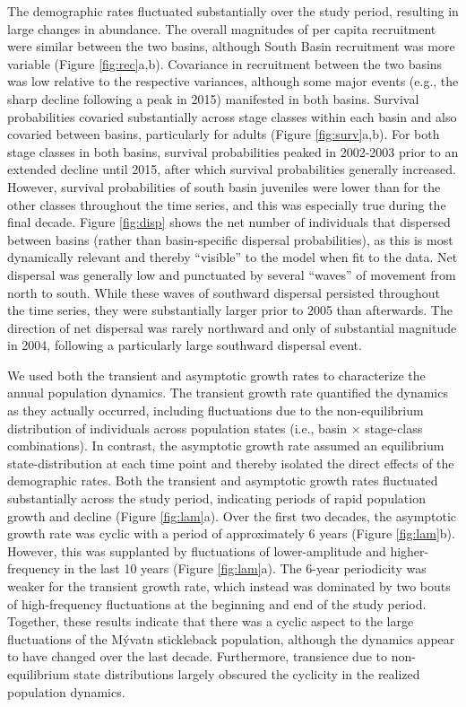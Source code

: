 \documentclass[11pt]{article}
\begin{document}
The demographic rates fluctuated substantially over the study period,
resulting in large changes in abundance.
The overall magnitudes of per capita recruitment were similar between the two basins,
although South Basin recruitment was more variable (Figure \ref{fig:rec}a,b).
Covariance in recruitment between the two basins was low relative
to the respective variances,
although some major events (e.g., the sharp decline following a peak in 2015)
manifested in both basins.
Survival probabilities covaried substantially across stage classes within each basin
and also covaried between basins, particularly for adults (Figure \ref{fig:surv}a,b).
For both stage classes in both basins,
survival probabilities peaked in 2002-2003
prior to an extended decline until 2015,
after which survival probabilities generally increased.
However, survival probabilities of south basin juveniles were lower
than for the other classes throughout the time series,
and this was especially true during the final decade.
Figure \ref{fig:disp} shows the net number of individuals
that dispersed between basins (rather than basin-specific dispersal probabilities),
as this is most dynamically relevant
and thereby ``visible'' to the model when fit to the data.
Net dispersal was generally low and punctuated by several ``waves'' of movement from
north to south.
While these waves of southward dispersal persisted throughout the time series,
they were substantially larger prior to 2005 than afterwards.
The direction of net dispersal was rarely northward and only of substantial magnitude in 2004,
following a particularly large southward dispersal event.

We used both the transient and asymptotic growth rates
to characterize the annual population dynamics.
The transient growth rate quantified the dynamics as they actually occurred,
including fluctuations due to the non-equilibrium distribution of individuals across
population states (i.e., basin $\times$ stage-class combinations).
In contrast, the asymptotic growth rate assumed an equilibrium state-distribution
at each time point and thereby isolated the direct effects of the demographic rates.
Both the transient and asymptotic growth rates fluctuated substantially
across the study period,
indicating periods of rapid population growth and decline (Figure \ref{fig:lam}a).
Over the first two decades,
the asymptotic growth rate was cyclic with a period of approximately 6 years
(Figure \ref{fig:lam}b).
However, this was supplanted by fluctuations of lower-amplitude and higher-frequency
in the last 10 years (Figure \ref{fig:lam}a).
The 6-year periodicity was weaker for the transient growth rate,
which instead was dominated by two bouts of high-frequency fluctuations
at the beginning and end of the study period.
Together, these results indicate that there was a cyclic aspect to the large fluctuations
of the M\'{y}vatn stickleback population,
although the dynamics appear to have changed over the last decade.
Furthermore, transience due to non-equilibrium state distributions
largely obscured the cyclicity in the realized population dynamics.
\end{document}
